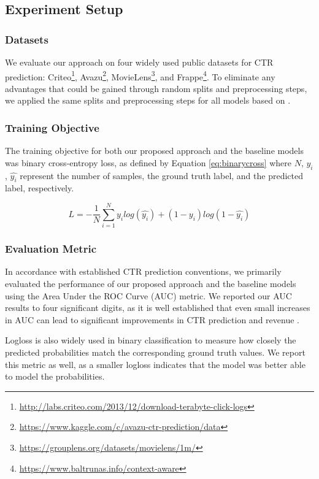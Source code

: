 \documentclass{article}
\begin{document}
\subsection{Experiment Setup}

\subsubsection{Datasets}

We evaluate our approach on four widely used public datasets for CTR prediction: Criteo\footnote{\url{http://labs.criteo.com/2013/12/download-terabyte-click-logs}}, Avazu\footnote{\url{https://www.kaggle.com/c/avazu-ctr-prediction/data}}, MovieLens\footnote{\url{https://grouplens.org/datasets/movielens/1m/}}, and Frappe\footnote{\url{https://www.baltrunas.info/context-aware}}. To eliminate any advantages that could be gained through random splits and preprocessing steps, we applied the same splits and preprocessing steps for all models based on \cite{cheng2020adaptive}.

\subsubsection{Training Objective}

The training objective for both our proposed approach and the baseline models was binary cross-entropy loss, as defined by Equation \ref{eq:binarycross} where $N$, $y_i$, $\widehat{y_i}$  represent the number of samples, the ground truth label, and the predicted label, respectively.

\begin{equation}\label{eq:binarycross}
L=-\frac{1}{N}\sum_{i=1}^{N}{y_ilog\left(\widehat{y_i}\right)}+\left(1-y_i\right)log\left(1-\widehat{y_i}\right)
\end{equation}

\subsubsection{Evaluation Metric}
In accordance with established CTR prediction conventions, we primarily evaluated the performance of our proposed approach and the baseline models using the Area Under the ROC Curve (AUC) metric. We reported our AUC results to four significant digits, as it is well established that even small increases in AUC can lead to significant improvements in CTR prediction and revenue \cite{cheng2016wide}.

Logloss is also widely used in binary classification to measure how closely the predicted probabilities match the corresponding ground truth values. We report this metric as well, as a smaller logloss indicates that the model was better able to model the probabilities.
\end{document}
